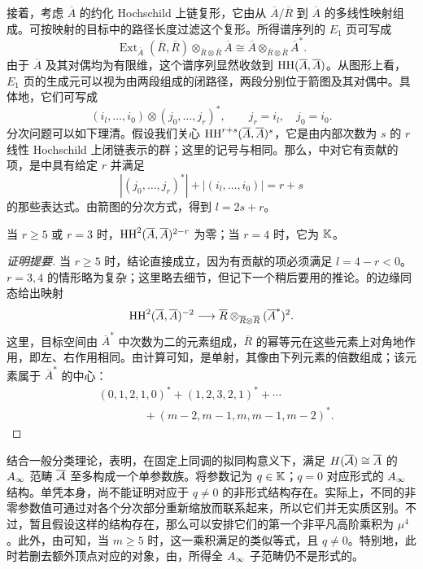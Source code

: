 接着，考虑 $\overline A$ 的约化 Hochschild 上链复形，它由从 $\overline A/\overline R$ 到 $\overline A$ 的多线性映射组成。可按映射的目标中的路径长度过滤这个复形。所得谱序列的 $E_1$ 页可写成
\begin{equation}\label{eq:20.13}
\operatorname{Ext}_{\overline A}(\overline R,\overline R)
\otimes_{\overline R\otimes\overline R}\overline A
\cong\overline A\otimes_{\overline R\otimes\overline R}\overline A^*.
\end{equation}
由于 $\overline A$ 及其对偶均为有限维，这个谱序列显然收敛到 $\operatorname{HH}(\overline A,\overline A)$。从图形上看，$E_1$ 页的生成元可以视为由两段组成的闭路径，两段分别位于箭图及其对偶中。具体地，它们可写成
\begin{equation}\label{eq:20.14}
(i_l,\ldots,i_0)\otimes(j_0,\ldots,j_r)^*,\qquad j_r=i_l,\quad j_0=i_0.
\end{equation}
分次问题可以如下理清。假设我们关心 $\operatorname{HH}^{r+s}(\overline A,\overline A)^s$，它是由内部次数为 $s$ 的 $r$ 线性 Hochschild 上闭链表示的群；这里的记号与相同。那么，中对它有贡献的项，是中具有给定 $r$ 并满足
\[
|(j_0,\ldots,j_r)^*|+|(i_l,\ldots,i_0)|=r+s
\]
的那些表达式。由箭图的分次方式，得到 $l=2s+r$。
\begin{lemma}\label{st:20.2}
当 $r\ge5$ 或 $r=3$ 时，$\operatorname{HH}^2(\overline A,\overline A)^{2-r}$ 为零；当 $r=4$ 时，它为 $\mathbb K$。
\end{lemma}
\begin{proof}[证明提要]
当 $r\ge5$ 时，结论直接成立，因为有贡献的项必须满足 $l=4-r<0$。$r=3,4$ 的情形略为复杂；这里略去细节，但记下一个稍后要用的推论。的边缘同态给出映射
\begin{equation}\label{eq:20.15}
\operatorname{HH}^2(\overline A,\overline A)^{-2}\longrightarrow
\overline R\otimes_{\overline R\otimes\overline R}(\overline A^*)^2.
\end{equation}
这里，目标空间由 $\overline A^*$ 中次数为二的元素组成，$\overline R$ 的幂等元在这些元素上对角地作用，即左、右作用相同。由计算可知，是单射，其像由下列元素的倍数组成；该元素属于 $\overline A^*$ 的中心：
\begin{equation}\label{eq:20.16}
\begin{aligned}
&(0,1,2,1,0)^*+(1,2,3,2,1)^*+\cdots\\
&\hspace{4em}+(m-2,m-1,m,m-1,m-2)^*.
\end{aligned}
\end{equation}
\end{proof}

结合一般分类理论，表明，在固定上同调的拟同构意义下，满足 $H(\overline{\mathcal A})\cong\overline A$ 的 $A_\infty$ 范畴 $\overline{\mathcal A}$ 至多构成一个单参数族。将参数记为 $q\in\mathbb K$；$q=0$ 对应形式的 $A_\infty$ 结构。单凭本身，尚不能证明对应于 $q\ne0$ 的非形式结构存在。实际上，不同的非零参数值可通过对各个分次部分重新缩放而联系起来，所以它们并无实质区别。不过，暂且假设这样的结构存在，那么可以安排它们的第一个非平凡高阶乘积为 $\mu^4$。此外，由可知，当 $m\ge5$ 时，这一乘积满足的类似等式，且 $q\ne0$。特别地，此时若删去额外顶点对应的对象，由，所得全 $A_\infty$ 子范畴仍不是形式的。
